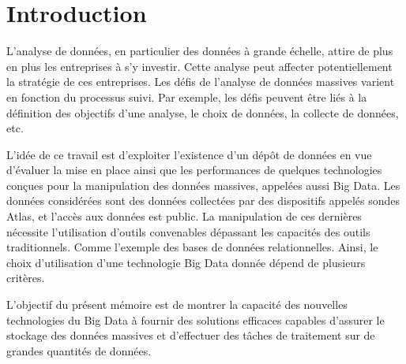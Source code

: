 \chapter*{Introduction}

L'analyse de données, en particulier des données à grande échelle, attire de plus en plus les entreprises à s'y investir.  Cette analyse peut affecter potentiellement la stratégie de ces entreprises. 
Les défis de l'analyse de données massives varient en fonction du processus suivi. Par exemple, les défis peuvent être liés à la définition  des objectifs d'une analyse, le choix de données, la collecte de données, etc.


L'idée de ce travail est  d'exploiter l'existence d'un dépôt de données en vue d'évaluer la mise en place ainsi que les performances de quelques technologies conçues pour la manipulation des données massives, appelées aussi Big Data.
Les données considérées sont des données  collectées par des dispositifs appelés sondes Atlas,  et  l'accès aux données est public. 
 La manipulation de ces dernières nécessite l'utilisation d'outils convenables dépassant les capacités des outils traditionnels. Comme l'exemple des bases de données relationnelles.  Ainsi, le choix d'utilisation d'une technologie Big Data donnée dépend de plusieurs critères. 


L'objectif du présent mémoire est de montrer la capacité des nouvelles technologies du Big Data à fournir des solutions efficaces capables d'assurer le stockage des données massives et d'effectuer des tâches de traitement sur de grandes quantités de données. 


